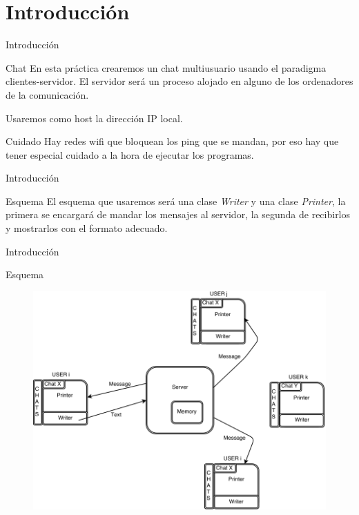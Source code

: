 \section{Introducción}
\begin{frame}{Introducción}
	\begin{block}{Chat}
		En esta práctica crearemos un chat multiusuario usando el paradigma clientes-servidor. El servidor será
		un proceso alojado en alguno de los ordenadores de la comunicación. 
		
		Usaremos como host la dirección IP local.
	\end{block}
	\begin{alertblock}{Cuidado}
		Hay redes wifi que bloquean los ping que se mandan, por eso
		hay que tener especial cuidado a la hora de ejecutar los programas.
	\end{alertblock}
\end{frame}




\begin{frame}{Introducción}
	\begin{block}{Esquema}
		El esquema que usaremos será una clase \textit{Writer} y una clase \textit{Printer}, la primera se encargará de mandar los mensajes al servidor, la segunda de recibirlos y mostrarlos con el formato adecuado.
	\end{block}
\end{frame}




\begin{frame}{Introducción}
	\begin{exampleblock}{Esquema}
		\begin{figure}[H]
    		\includegraphics[scale=0.31]{./Imagenes/chat.png}
		\end{figure}
	\end{exampleblock}
\end{frame}